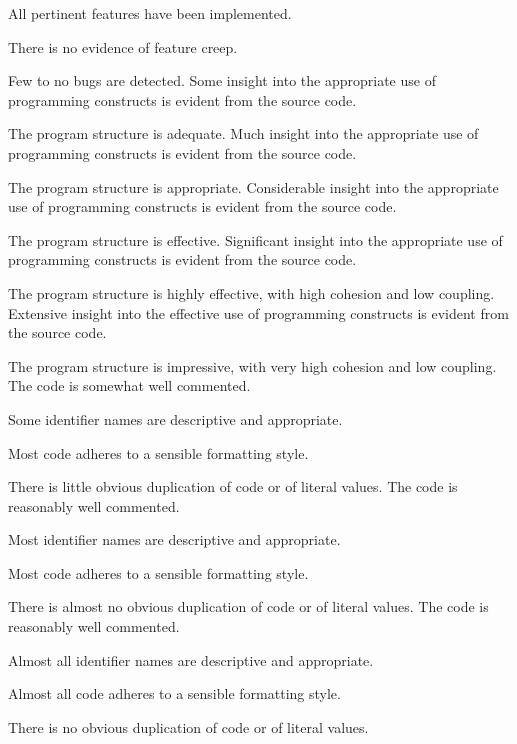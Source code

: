 \begin{markingrubric}
        \grade All pertinent features have been implemented.
            \par There is no evidence of feature creep.
            \par Few to no bugs are detected.
%
        \grade \fail 
        \grade Some insight into the appropriate use of programming constructs is evident from the source code.
            \par The program structure is adequate.
        \grade Much insight into the appropriate use of programming constructs is evident from the source code.
            \par The program structure is appropriate.
        \grade Considerable insight into the appropriate use of programming constructs is evident from the source code.
            \par The program structure is effective.
        \grade Significant insight into the appropriate use of programming constructs is evident from the source code.
            \par The program structure is highly effective, with high cohesion and low coupling.
        \grade Extensive insight into the effective use of programming constructs is evident from the source code.
            \par The program structure is impressive, with very high cohesion and low coupling.
%
        \grade \fail 
        \grade The code is somewhat well commented.
            \par Some identifier names are descriptive and appropriate.
            \par Most code adheres to a sensible formatting style.
             \par There is little obvious duplication of code or of literal values.           
        \grade The code is reasonably well commented.
            \par Most identifier names are descriptive and appropriate.
            \par Most code adheres to a sensible formatting style.
             \par There is almost no obvious duplication of code or of literal values.   
        \grade The code is reasonably well commented.
            \par Almost all identifier names are descriptive and appropriate.
            \par Almost all code adheres to a sensible formatting style.
             \par There is no obvious duplication of code or of literal values.

\end{markingrubric}
